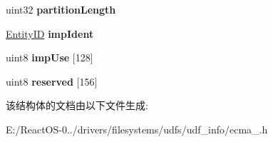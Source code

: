 \begin{DoxyCompactItemize}
uint32 {\bfseries partition\+Length}
\item 
\mbox{\label{struct_partition_desc_ac5cbed48e69bcb0d2dc8f81728bd47c8}} 
\hyperlink{struct_entity_i_d}{Entity\+ID} {\bfseries imp\+Ident}
\item 
\mbox{\label{struct_partition_desc_af653af6336e21dbedbcf4be6439bb31a}} 
uint8 {\bfseries imp\+Use} \mbox{[}128\mbox{]}
\item 
\mbox{\label{struct_partition_desc_a1021094bfdcf03a8167981f17a0afe0c}} 
uint8 {\bfseries reserved} \mbox{[}156\mbox{]}
\end{DoxyCompactItemize}


该结构体的文档由以下文件生成\+:\begin{DoxyCompactItemize}
\item 
E\+:/\+React\+O\+S-\/0../drivers/filesystems/udfs/udf\+\_\+info/ecma\+\_.\+h\end{DoxyCompactItemize}
